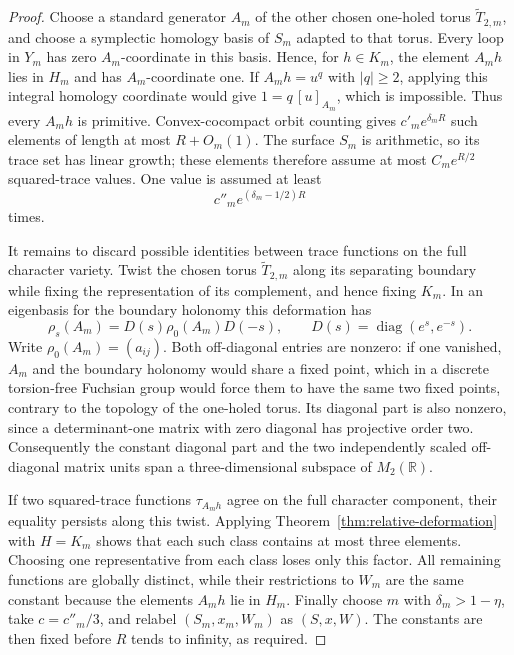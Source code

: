 \documentclass[11pt,reqno]{amsart}
\theoremstyle{definition}
\theoremstyle{remark}
\newcommand{\R}{\mathbb R}
\begin{document}
\begin{proof}
Choose a standard generator \(A_m\) of the other chosen one-holed torus
\(\widetilde T_{2,m}\), and choose a symplectic homology basis of \(S_m\)
adapted to that torus.  Every loop in \(Y_m\) has zero \(A_m\)-coordinate in
this basis.  Hence, for \(h\in K_m\), the element \(A_mh\) lies in \(H_m\)
and has \(A_m\)-coordinate one.  If \(A_mh=u^q\) with \(|q|\ge2\), applying
this integral homology coordinate would give \(1=q\,[u]_{A_m}\), which is
impossible.  Thus every \(A_mh\) is primitive.
Convex-cocompact orbit counting gives \(c'_m e^{\delta_mR}\) such
elements of length at most \(R+O_m(1)\).  The surface \(S_m\) is arithmetic,
so its trace set has linear growth; these elements therefore assume at most
\(C_me^{R/2}\) squared-trace values.  One value is assumed at least
\[
 c''_m e^{(\delta_m-1/2)R}
\]
times.

It remains to discard possible identities between trace functions on the
full character variety.  Twist the chosen torus \(\widetilde T_{2,m}\) along
its separating boundary while fixing the representation of its complement,
and hence fixing \(K_m\).  In an eigenbasis for the boundary holonomy this
deformation has
\[
 \rho_s(A_m)=D(s)\rho_0(A_m)D(-s),
 \qquad D(s)=\operatorname{diag}(e^s,e^{-s}).
\]
Write \(\rho_0(A_m)=(a_{ij})\).  Both off-diagonal entries are nonzero: if
one vanished, \(A_m\) and the boundary holonomy would share a fixed point,
which in a discrete torsion-free Fuchsian group would force them to have the
same two fixed points, contrary to the topology of the one-holed torus.  Its
diagonal part is also nonzero, since a determinant-one matrix with zero
diagonal has projective order two.  Consequently the constant diagonal part
and the two independently scaled off-diagonal matrix units span a
three-dimensional subspace of \(M_2(\R)\).

If two squared-trace functions \(\tau_{A_mh}\) agree on the full character
component, their equality persists along this twist.  Applying
Theorem~\ref{thm:relative-deformation} with \(H=K_m\) shows that each such
class contains at most three elements.  Choosing one representative from
each class loses only this factor.  All remaining functions are globally
distinct, while their restrictions to \(W_m\) are the same constant because
the elements \(A_mh\) lie in \(H_m\).  Finally choose \(m\) with
\(\delta_m>1-\eta\), take \(c=c''_m/3\), and relabel
\((S_m,x_m,W_m)\) as \((S,x,W)\).  The constants are then fixed before
\(R\) tends to infinity, as required.
\end{proof}
\end{document}
